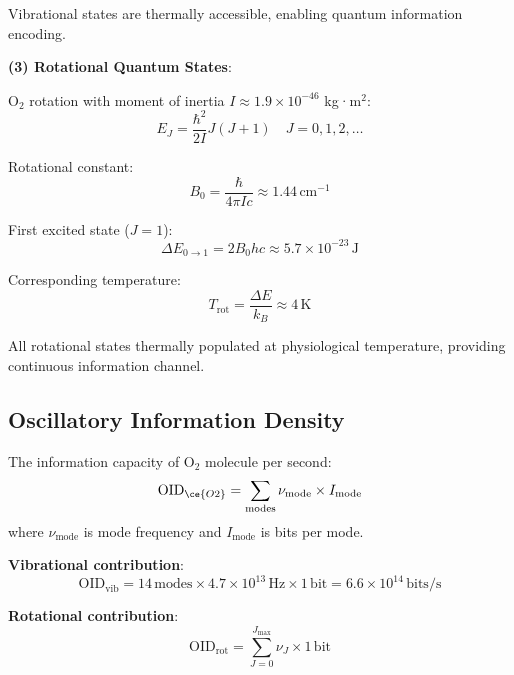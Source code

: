 \documentclass[11pt,onecolumn]{article}
\begin{document}
Vibrational states are thermally accessible, enabling quantum information encoding.

\textbf{(3) Rotational Quantum States}:

O$_2$ rotation with moment of inertia $I \approx 1.9 \times 10^{-46}$ kg·m$^2$:
\begin{equation}
E_J = \frac{\hbar^2}{2I}J(J+1) \quad J = 0,1,2,\ldots
\end{equation}

Rotational constant:
\begin{equation}
B_0 = \frac{\hbar}{4\pi I c} \approx 1.44\,\text{cm}^{-1}
\end{equation}

First excited state ($J=1$):
\begin{equation}
\Delta E_{0 \to 1} = 2B_0 hc \approx 5.7 \times 10^{-23}\,\text{J}
\end{equation}

Corresponding temperature:
\begin{equation}
T_{\text{rot}} = \frac{\Delta E}{k_B} \approx 4\,\text{K}
\end{equation}

All rotational states thermally populated at physiological temperature, providing continuous information channel.

\subsection{Oscillatory Information Density}

\begin{definition}
The information capacity of O$_2$ molecule per second:
\begin{equation}
\text{OID}_{\ce{O2}} = \sum_{\text{modes}} \nu_{\text{mode}} \times I_{\text{mode}}
\end{equation}
where $\nu_{\text{mode}}$ is mode frequency and $I_{\text{mode}}$ is bits per mode.
\end{definition}

\textbf{Vibrational contribution}:
\begin{equation}
\text{OID}_{\text{vib}} = 14\,\text{modes} \times 4.7 \times 10^{13}\,\text{Hz} \times 1\,\text{bit} = 6.6 \times 10^{14}\,\text{bits/s}
\end{equation}

\textbf{Rotational contribution}:
\begin{equation}
\text{OID}_{\text{rot}} = \sum_{J=0}^{J_{\max}} \nu_J \times 1\,\text{bit}
\end{equation}
\end{document}
